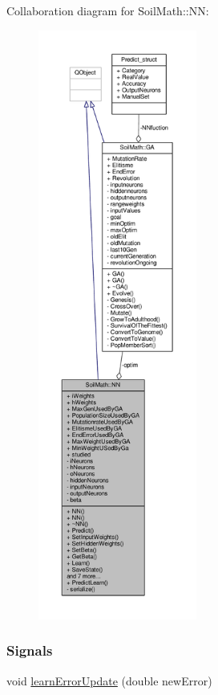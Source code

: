 Collaboration diagram for Soil\+Math\+:\+:N\+N\+:
\nopagebreak
\begin{figure}[H]
\begin{center}
\leavevmode
\includegraphics[height=550pt]{class_soil_math_1_1_n_n__coll__graph}
\end{center}
\end{figure}
\subsubsection*{Signals}
\begin{DoxyCompactItemize}
\item 
void \hyperlink{class_soil_math_1_1_n_n_ae207eda16ae755e5bce5eb48ab8fe45c}{learn\+Error\+Update} (double new\+Error)
\end{DoxyCompactItemize}
